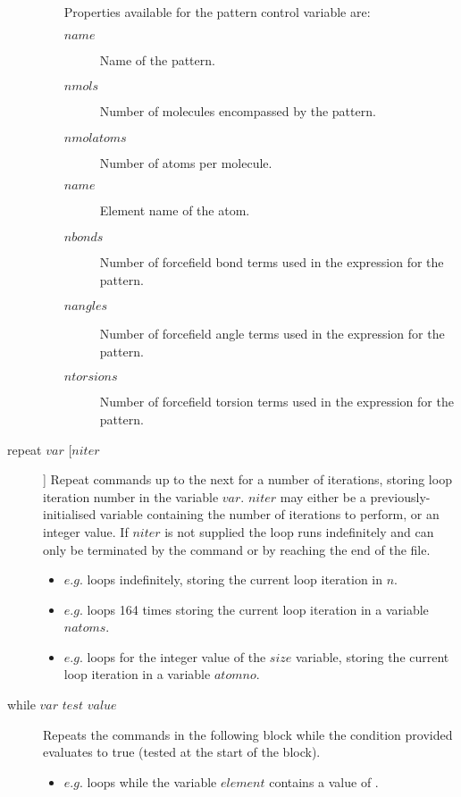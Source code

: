 \begin{description}
\begin{itemize}
			Properties available for the pattern control variable are:
			\begin{description}
				\item[$name$\its]
					Name of the pattern.
				\item[$nmols$\its]
					Number of molecules encompassed by the pattern.
				\item[$nmolatoms$\its]
					Number of atoms per molecule.
				\item[$name$\its]
					Element name of the atom.
				\item[$nbonds$\its]
					Number of forcefield bond terms used in the expression for the pattern.
				\item[$nangles$\its]
					Number of forcefield angle terms used in the expression for the pattern.
				\item[$ntorsions$\its]
					Number of forcefield torsion terms used in the expression for the pattern.
			\end{description}
		\end{itemize}


	\item[repeat $var$ [$niter$]\its]
	Repeat commands up to the next  for a number of iterations, storing loop iteration number in the variable $var$. $niter$ may either be a previously-initialised variable containing the number of iterations to perform, or an integer value. If $niter$ is not supplied the loop runs indefinitely and can only be terminated by the  command or by reaching the end of the file.
	\begin{itemize}
		\item $e.g.$  loops indefinitely, storing the current loop iteration in $n$.
		\item $e.g.$  loops 164 times storing the current loop iteration in a variable $natoms$.
		\item $e.g.$  loops for the integer value of the $size$ variable, storing the current loop iteration in a variable $atomno$.
	\end{itemize}

	\item[while $var$ $test$ $value$\its]
	Repeats the commands in the following block while the condition provided evaluates to true (tested at the start of the block).
	\begin{itemize}
		\item $e.g.$  loops while the variable $element$ contains a value of .
	\end{itemize}

\end{description}

